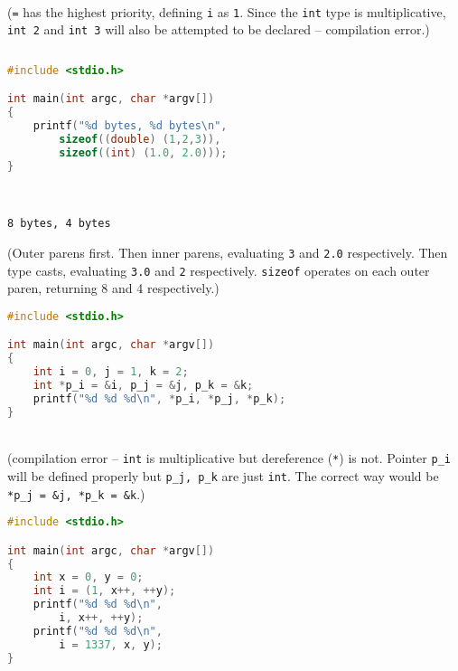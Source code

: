 \documentclass[a4paper]{article}
\begin{document}
\begin{exmp}
\begin{multicols}{2}
\columnbreak
\; \\

(\texttt{=} has the highest priority, defining \texttt{i} as \texttt{1}. Since the \texttt{int} type is multiplicative, \texttt{int 2} and \texttt{int 3} will also be attempted to be declared -- compilation error.)
\begin{verbatim}
\end{verbatim}
\end{multicols}


\begin{multicols}{2}
\begin{lstlisting}[language=c]
#include <stdio.h>

int main(int argc, char *argv[])
{
	printf("%d bytes, %d bytes\n",
	    sizeof((double) (1,2,3)),
	    sizeof((int) (1.0, 2.0)));
}
\end{lstlisting}
\columnbreak

\; \\
\begin{verbatim}
8 bytes, 4 bytes
\end{verbatim}
(Outer parens first. Then inner parens, evaluating \texttt{3} and \texttt{2.0} respectively. Then type casts, evaluating \texttt{3.0} and \texttt{2} respectively. \texttt{sizeof} operates on each outer paren, returning 8 and 4 respectively.)

\end{multicols}




\begin{multicols}{2}

\begin{lstlisting}[language=c]
#include <stdio.h>

int main(int argc, char *argv[])
{
	int i = 0, j = 1, k = 2;
	int *p_i = &i, p_j = &j, p_k = &k;
	printf("%d %d %d\n", *p_i, *p_j, *p_k);
}
\end{lstlisting}
\columnbreak
\; \\
(compilation error -- \texttt{int} is multiplicative but dereference (\texttt{*}) is not. Pointer \texttt{p\_i} will be defined properly but \texttt{p\_j, p\_k} are just \texttt{int}. The correct way would be \texttt{*p\_j = \&j, *p\_k = \&k}.)
\end{multicols}

\clearpage
\begin{multicols}{2}
\begin{lstlisting}[language=c]
#include <stdio.h>

int main(int argc, char *argv[])
{
	int x = 0, y = 0;
	int i = (1, x++, ++y);
	printf("%d %d %d\n",
	    i, x++, ++y);
	printf("%d %d %d\n",
	    i = 1337, x, y);
}
\end{lstlisting}


\end{multicols}
\end{exmp}
\end{document}
